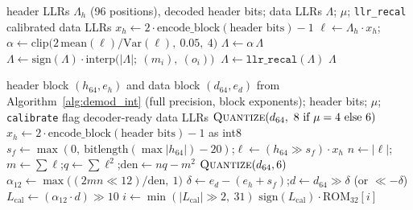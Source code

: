 \begin{algorithm}[H]
\caption{Float LLR calibration as deployed (\texttt{Transceiver.demod\_frame}).}
\label{alg:cal_float}
\begin{algorithmic}[1]
\Require header LLRs $\Lambda_h$ (96 positions), decoded header bits; data LLRs $\Lambda$; $\mu$; \texttt{llr\_recal}
\Ensure calibrated data LLRs
\State $x_h \gets 2\cdot\mathrm{encode\_block}(\text{header bits}) - 1$ 
\State $\ell \gets \Lambda_h \cdot x_h$;\quad $\alpha \gets \mathrm{clip}\big(2\,\mathrm{mean}(\ell) / \mathrm{Var}(\ell),\ 0.05,\ 4\big)$ 
\State $\Lambda \gets \alpha\, \Lambda$ 
 
    \State $\Lambda \gets \mathrm{sign}(\Lambda) \cdot \mathrm{interp}\big(|\Lambda|;\ (m_i),\ (o_i)\big)$ 
 $\ \Lambda \gets \texttt{llr\_recal}(\Lambda)$
\EndIf
\State \Return $\Lambda$ 
\end{algorithmic}
\end{algorithm}

\begin{algorithm}[H]
\caption{Integer LLR calibration (fixed-point twin and C port).}
\label{alg:cal_int}
\begin{algorithmic}[1]
\Require header block $(h_{64}, e_h)$ and data block $(d_{64}, e_d)$ from Algorithm~\ref{alg:demod_int} (full precision, block exponents); header bits; $\mu$; \texttt{calibrate} flag
\Ensure decoder-ready data LLRs
 \Return $\textsc{Quantize}(d_{64},\ 8 \text{ if } \mu = 4 \text{ else } 6)$ \EndIf
\State $x_h \gets 2\cdot\mathrm{encode\_block}(\text{header bits}) - 1$ as int8 
\State $s_f \gets \max(0,\ \mathrm{bitlength}(\max |h_{64}|) - 20)$;\quad $\ell \gets (h_{64} \gg s_f) \cdot x_h$ 
\State $n \gets |\ell|$;\quad $m \gets \sum \ell$;\quad $q \gets \sum \ell^2$;\quad $\mathrm{den} \gets n q - m^2$
 \Return $\textsc{Quantize}(d_{64}, 6)$  \EndIf
\State $\alpha_{12} \gets \max\big((2 m n \ll 12) / \mathrm{den},\ 1\big)$ 
\State $\delta \gets e_d - (e_h + s_f)$;\quad $d \gets d_{64} \gg \delta$ (or $\ll -\delta$) 
\State $L_{\mathrm{cal}} \gets (\alpha_{12} \cdot d) \gg 10$ 
\State $i \gets \min(|L_{\mathrm{cal}}| \gg 2,\ 31)$ 
\State \Return $\mathrm{sign}(L_{\mathrm{cal}}) \cdot \mathrm{ROM}_{32}[i]$ 
\end{algorithmic}
\end{algorithm}

